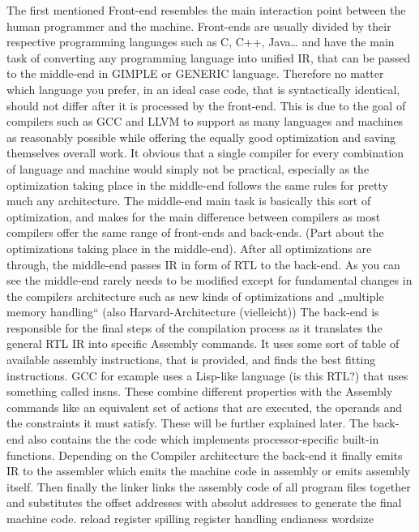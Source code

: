 The first mentioned Front-end resembles the main interaction point between the human programmer and the machine. Front-ends are usually divided by their respective programming languages such as C, C++, Java…  and have the main task of converting any programming language into unified IR, that can be passed to the middle-end in GIMPLE or GENERIC language. Therefore no matter which language you prefer, in an ideal case code, that is syntactically identical, should not differ after it is processed by the front-end. This is due to the goal of compilers such as GCC and LLVM to support as many languages and machines as reasonably possible while offering the equally good optimization and saving themselves overall work. It obvious that a single compiler for every combination of language and machine would simply not be practical, especially as the optimization taking place in the middle-end follows the same rules for pretty much any architecture.
The middle-end main task is basically this sort of optimization, and makes for the main difference between compilers as most compilers offer the same range of front-ends and back-ends. (Part about the optimizations taking place in the middle-end). After all optimizations are through, the middle-end passes IR in form of RTL to the back-end. As you can see the middle-end rarely needs to be modified except for fundamental changes in the compilers architecture such as new kinds of optimizations and „multiple memory handling“ (also Harvard-Architecture (vielleicht))
The back-end is responsible for the final steps of the compilation process as it translates the general RTL IR into specific Assembly commands. It uses some sort of table of available assembly instructions, that is provided, and finds the best fitting instructions. GCC for example uses a Lisp-like language (is this RTL?) that uses something called insns. These combine different properties with the  Assembly commands like an equivalent set of actions that are executed, the  operands and the constraints it must satisfy. These will be further explained later. The back-end also contains the the code which implements processor-specific built-in functions.
Depending on the Compiler architecture the back-end it finally emits IR to the assembler which emits the machine code in assembly or emits assembly itself. Then finally the linker links the assembly code of all program files together and substitutes the offset addresses with absolut addresses to generate the final machine code.
reload
register spilling
register handling
endianess
wordsize



\nocite{berge_iscas07}
